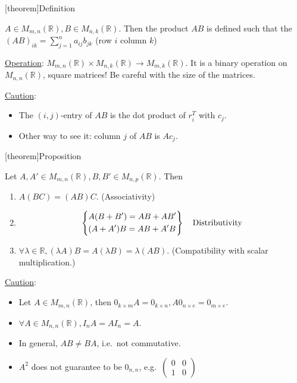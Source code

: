 \documentclass[12pt]{report}
\theoremstyle{definition}
\begin{document}
[theorem]{Definition}
\begin{matrix multiplicatioin}
    $A \in M_{m, n}(\mathbb{R}), B \in M_{n, k}(\mathbb{R})$. Then the product $AB$
    is defined such that the ${(AB)}_{ik} = \sum_{j = 1}^{n} a_{ij}b_{jk}$ (row $i$ column $k$)
\end{matrix multiplicatioin}

\underline{Operation}: $M_{m,n}(\mathbb{R}) \times M_{n, k}(\mathbb{R}) \rightarrow{} M_{m, k}(\mathbb{R})$.
It is a binary operation on $M_{n,n}(\mathbb{R})$, square matrices! 
Be careful with the size of the matrices.

\bigskip
\underline{Caution}:

\begin{itemize}
    \item The $(i, j)$-entry of $AB$ is the dot product of $r_i^{T}$ with $c_j$.

    \item Other way to see it: column $j$ of $AB$ is $Ac_j$.
\end{itemize}

[theorem]{Proposition}
\begin{matrix properties}
    Let $A, A' \in M_{m,n}(\mathbb{R}), B, B' \in M_{n,p}(\mathbb{R})$. Then
    \begin{enumerate}[label = (\arabic*)]
        \item $A(BC) = (AB)C$. (Associativity)
        \item \[
            \left\{
                \begin{align*}
                    & A(B + B') = AB + AB' \\
                    & (A + A')B = AB + A'B
                \end{align*}
            \right\} \quad \textnormal{Distributivity}
        \]
                
    \item $\forall \lambda \in \mathbb{R}, (\lambda A)B = A(\lambda B) = \lambda (AB)$.
        (Compatibility with scalar multiplication.)
    \end{enumerate}
    
\end{matrix properties}


\underline{Caution}: 
\begin{itemize}
    \item Let $A \in M_{m,n}(\mathbb{R})$, then $0_{k \times m} A = 0_{k\times n},
        A 0_{n \times e} = 0_{m \times e}$.

    \item $\forall A \in M_{n,n}(\mathbb{R}), I_n A = AI_n = A$.

    \item In general, $AB \neq BA$, i.e.\ not commutative.

    \item $A^2$ does not guarantee to be $0_{n, n}$, e.g.\ $\begin{pmatrix}
            0 & 0 \\
            1 & 0 
    \end{pmatrix} $
\end{itemize}
\end{document}
